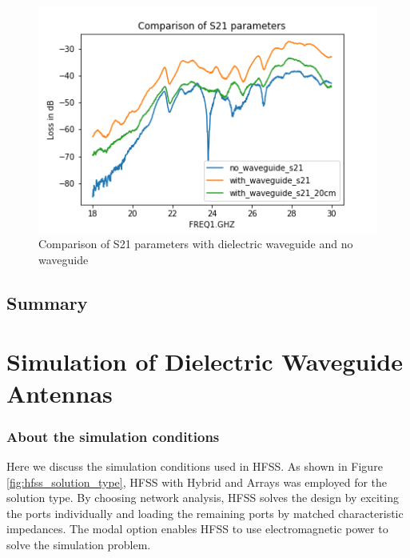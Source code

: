 \documentclass[a4paper,12pt]{report}
\begin{document}
\begin{figure}
  \begin{center}
    \includegraphics[clip, keepaspectratio, width=0.9\linewidth]{img/s21_comparison.png}
    \caption{Comparison of S21 parameters with dielectric waveguide and no waveguide}
    \label{fig:s21_comparison} 
  \end{center}
\end{figure}

\section{Summary}


\chapter{Simulation of Dielectric Waveguide Antennas}

\subsection{About the simulation conditions}

Here we discuss the simulation conditions used in HFSS.
As shown in Figure \ref{fig:hfss_solution_type},
HFSS with Hybrid and Arrays was employed for the solution type.
By choosing network analysis,
HFSS solves the design by exciting the ports individually
and loading the remaining ports by matched characteristic impedances.
The modal option enables HFSS to use electromagnetic power to solve the simulation problem.
\end{document}

